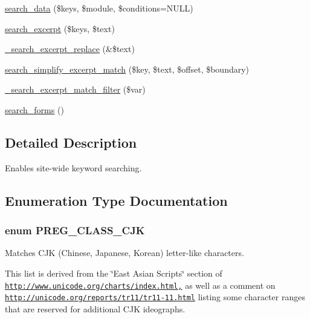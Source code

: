 \begin{DoxyCompactItemize}
\item 
\hyperlink{group__search_gadc45d10981f71a4d12879254b14c2c99}{search\_\-data} (\$keys, \$module, \$conditions=NULL)
\item 
\hyperlink{group__search_gaa77622185b2d7ea771cf590d76ab3ba4}{search\_\-excerpt} (\$keys, \$text)
\item 
\hyperlink{search_8module_a7aff627bdbf0ad6208ded5e75e53f67f}{\_\-search\_\-excerpt\_\-replace} (\&\$text)
\item 
\hyperlink{search_8module_a1224b2795f1334faa26bbb552f4f5856}{search\_\-simplify\_\-excerpt\_\-match} (\$key, \$text, \$offset, \$boundary)
\item 
\hyperlink{search_8module_abc952f2f6920f7647e15e1bde8330414}{\_\-search\_\-excerpt\_\-match\_\-filter} (\$var)
\item 
\hyperlink{search_8module_a3396c4111908648bd2d0ddff911449fa}{search\_\-forms} ()
\end{DoxyCompactItemize}


\subsection{Detailed Description}
Enables site-\/wide keyword searching. 

\subsection{Enumeration Type Documentation}
\hypertarget{search_8module_a44dc2b3df8c066a2d2ce47f25218f126}{
\subsubsection[{PREG\_\-CLASS\_\-CJK}]{\setlength{\rightskip}{0pt plus 5cm}enum {\bf PREG\_\-CLASS\_\-CJK}}}
\label{search_8module_a44dc2b3df8c066a2d2ce47f25218f126}
Matches CJK (Chinese, Japanese, Korean) letter-\/like characters.

This list is derived from the \char`\"{}East Asian Scripts\char`\"{} section of \href{http://www.unicode.org/charts/index.html,}{\tt http://www.unicode.org/charts/index.html,} as well as a comment on \href{http://unicode.org/reports/tr11/tr11-11.html}{\tt http://unicode.org/reports/tr11/tr11-\/11.html} listing some character ranges that are reserved for additional CJK ideographs.

